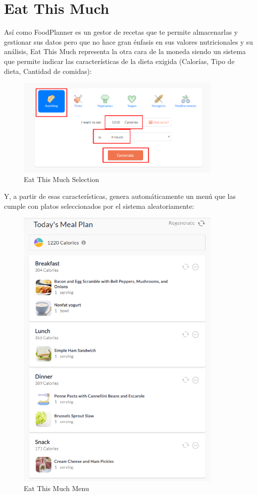 \documentclass[12pt, a4paper, twoside]{book}
\begin{document}
	\section{Eat This Much}
	Así como FoodPlanner es un gestor de recetas que te permite almacenarlas y gestionar sus datos pero que no hace gran énfasis en sus valores nutricionales y su análisis, Eat This Much representa la otra cara de la moneda siendo un sistema que permite indicar las características de la dieta exigida (Calorías, Tipo de dieta, Cantidad de comidas):
	\begin{center}
		\begin{figure}[H]
			\centering
			\includegraphics[width=10cm]{Imagenes/EatThisMuchSelection.png}
			\caption{Eat This Much Selection}\label{Eat This Much Selection}
		\end{figure}
	\end{center}
	Y, a partir de esas características, genera automáticamente un menú que las cumple con platos seleccionados por el sistema aleatoriamente:
	\begin{center}
		\begin{figure}[H]
			\centering
			\includegraphics[width=10cm]{Imagenes/EatThisMuchMenu.png}
			\caption{Eat This Much Menu}\label{Eat This Much Menu}
		\end{figure}
	\end{center}
\end{document}
